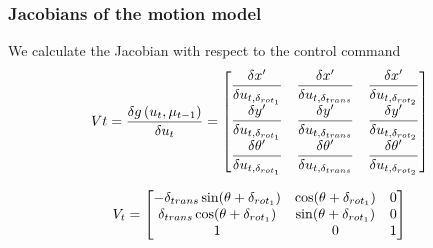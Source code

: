 \begin{frame}
    \frametitle{Jacobians of the motion model}
    
    We calculate the Jacobian with respect to the control command
    \begin{equation*}
        V{t} = \dfrac{\delta g\left( u_{t},\mu_{t-1} \right)}{\delta u_{t}} =
        \begin{bmatrix}
        \dfrac{\delta x^{\prime}}{\delta u_{t,\delta_{rot_{1}}}} & \dfrac{\delta x^{\prime}}{\delta u_{t,\delta_{trans}}} & \dfrac{\delta x^{\prime}}{\delta u_{t,\delta_{rot_{2}}}}\\
        \dfrac{\delta y^{\prime}}{\delta u_{t,\delta _{rot_{1}}}} & \dfrac{\delta y^{\prime}}{\delta u_{t,\delta _{trans}}} & \dfrac{\delta y^{\prime}}{\delta u_{t,\delta _{rot_{2}}}}\\
        \dfrac{\delta \theta^{\prime}}{\delta u_{t,\delta _{rot_{1}}}} & \dfrac{\delta \theta^{\prime}}{\delta u_{t,\delta _{trans}}} & \dfrac{\delta \theta^{\prime}}{\delta u_{t,\delta _{rot_{2}}}}
        \end{bmatrix}
    \end{equation*}
    
    \begin{equation*}
        V_{t} =
        \begin{bmatrix}
        -\delta_{trans} \sin(\theta + \delta _{rot_{1}}) & \cos(\theta + \delta _{rot_{1}}) & 0\\
        \delta _{trans} \cos(\theta + \delta _{rot_{1}}) & \sin(\theta + \delta _{rot _{1}}) & 0\\
        1 & 0 & 1\\
        \end{bmatrix}
    \end{equation*}
\end{frame}
    
